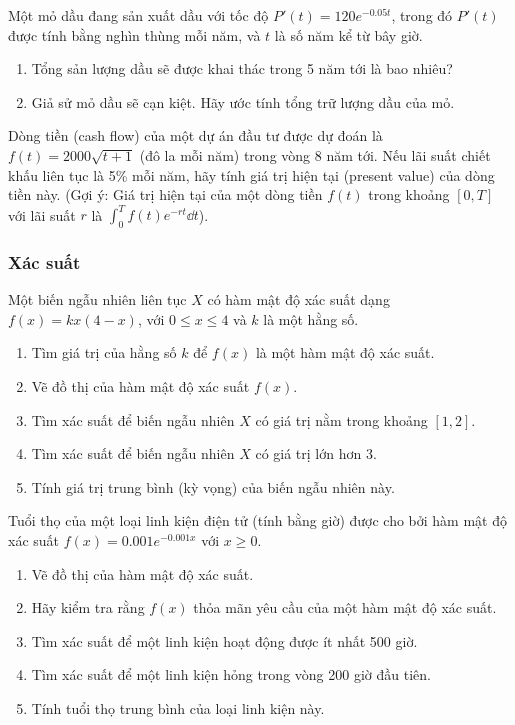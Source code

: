 \begin{exercise}
    Một mỏ dầu đang sản xuất dầu với tốc độ $P'(t) = 120e^{-0.05t}$, trong đó $P'(t)$ được tính bằng nghìn thùng mỗi năm, và $t$ là số năm kể từ bây giờ.
    \begin{enumerate}[label=(\alph*)]
        \item Tổng sản lượng dầu sẽ được khai thác trong 5 năm tới là bao nhiêu?
        \item Giả sử mỏ dầu sẽ cạn kiệt. Hãy ước tính tổng trữ lượng dầu của mỏ.
    \end{enumerate}
\end{exercise}

\begin{exercise}
    Dòng tiền (cash flow) của một dự án đầu tư được dự đoán là $f(t) = 2000\sqrt{t+1}$ (đô la mỗi năm) trong vòng 8 năm tới. Nếu lãi suất chiết khấu liên tục là 5\% mỗi năm, hãy tính giá trị hiện tại (present value) của dòng tiền này.
    (Gợi ý: Giá trị hiện tại của một dòng tiền $f(t)$ trong khoảng $[0, T]$ với lãi suất $r$ là $\int_0^T f(t)e^{-rt} \dd t$).
\end{exercise}

\subsubsection{Xác suất}

\begin{exercise}
    Một biến ngẫu nhiên liên tục $X$ có hàm mật độ xác suất dạng $f(x) = kx(4-x)$, với $0 \le x \le 4$ và $k$ là một hằng số.
    \begin{enumerate}[label=(\alph*)]
        \item Tìm giá trị của hằng số $k$ để $f(x)$ là một hàm mật độ xác suất.
        \item Vẽ đồ thị của hàm mật độ xác suất $f(x)$.
        \item Tìm xác suất để biến ngẫu nhiên $X$ có giá trị nằm trong khoảng $[1, 2]$.
        \item Tìm xác suất để biến ngẫu nhiên $X$ có giá trị lớn hơn 3.
        \item Tính giá trị trung bình (kỳ vọng) của biến ngẫu nhiên này.
    \end{enumerate}
\end{exercise}

\begin{exercise}
    Tuổi thọ của một loại linh kiện điện tử (tính bằng giờ) được cho bởi hàm mật độ xác suất $f(x) = 0.001e^{-0.001x}$ với $x \ge 0$.
    \begin{enumerate}[label=(\alph*)]
        \item Vẽ đồ thị của hàm mật độ xác suất.
        \item Hãy kiểm tra rằng $f(x)$ thỏa mãn yêu cầu của một hàm mật độ xác suất.
        \item Tìm xác suất để một linh kiện hoạt động được ít nhất 500 giờ.
        \item Tìm xác suất để một linh kiện hỏng trong vòng 200 giờ đầu tiên.
        \item Tính tuổi thọ trung bình của loại linh kiện này.
    \end{enumerate}
\end{exercise}

